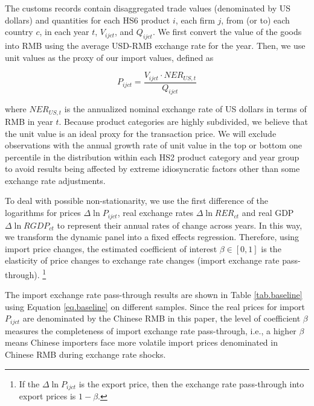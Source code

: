 The customs records contain disaggregated trade values (denominated by US dollars) and quantities for each HS6 product $i$, each firm $j$, from (or to) each country $c$, in each year $t$, $V_{ijct}$, and $Q_{ijct}$. We first convert the value of the goods into RMB using the average USD-RMB exchange rate for the year. Then, we use unit values as the proxy of our import values, defined as 

$$
P_{ijct}=\frac{V_{ijct}\cdot NER_{US,t}}{Q_{ijct}}
$$

where $NER_{US,t}$ is the annualized nominal exchange rate of US dollars in terms of RMB in year $t$. Because product categories are highly subdivided, we believe that the unit value is an ideal proxy for the transaction price. We will exclude observations with the annual growth rate of unit value in the top or bottom one percentile in the distribution within each HS2 product category and year group to avoid results being affected by extreme idiosyncratic factors other than some exchange rate adjustments.

To deal with possible non-stationarity, we use the first difference of the logarithms for prices $\Delta \ln P_{i j c t}$, real exchange rates $\Delta \ln R E R_{c t}$ and real GDP $\Delta \ln R G D P_{c t}$ to represent their annual rates of change across years. In this way, we transform the dynamic panel into a fixed effects regression. Therefore, using import price changes, the estimated coefficient of interest $\beta \in [0,1]$ is the elasticity of price changes to exchange rate changes (import exchange rate pass-through). \footnote{If the $\Delta \ln P_{i j c t}$ is the export price, then the exchange rate pass-through into export prices is $1-\beta$.}

The import exchange rate pass-through results are shown in Table \ref{tab.baseline} using Equation \ref{eq.baseline} on different samples. Since the real prices for import $P_{i j c t}$ are denominated by the Chinese RMB in this paper, the level of coefficient $\beta$ measures the completeness of import exchange rate pass-through, i.e., a higher $\beta$ means Chinese importers face more volatile import prices denominated in Chinese RMB during exchange rate shocks. 

